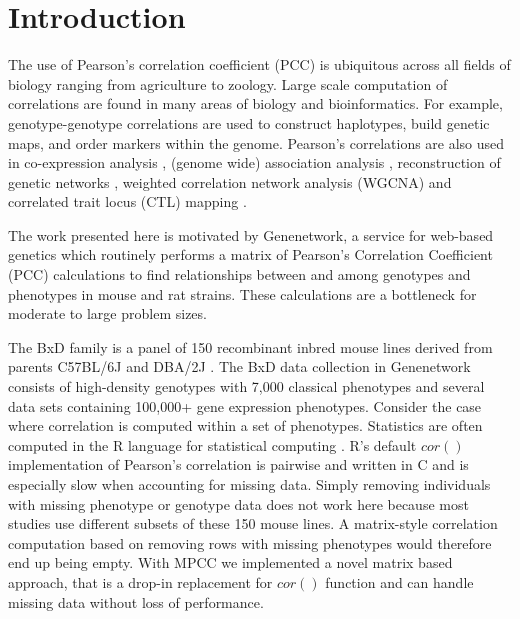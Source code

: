 \documentclass{bioinfo}
\begin{document}
\maketitle


\section{Introduction}

The use of Pearson's correlation coefficient (PCC) is ubiquitous
across all fields of biology ranging from agriculture to
zoology. Large scale computation of correlations are found in many
areas of biology and bioinformatics.  For example, genotype-genotype
correlations are used to construct haplotypes, build genetic maps, and
order markers within the genome. Pearson's correlations are also used
in co-expression analysis \citep{Tesson:2010}, (genome wide)
association analysis \citep{Cichonska:2016}, reconstruction of genetic
networks \citep{Fukushima:2013}, weighted correlation network analysis
(WGCNA) \citep{Horvath:2008} and correlated trait locus (CTL)
mapping \citep{Arends2016a}.



\enlargethispage{12pt}

The work presented here is motivated by Genenetwork, a service for
web-based genetics \citep{Sloan2016} which routinely performs a matrix
of Pearson's Correlation Coefficient (PCC) calculations to find
relationships between and among genotypes and phenotypes in mouse and
rat strains. These calculations are a bottleneck for moderate to large
problem sizes.



The BxD family is a panel of 150 recombinant inbred mouse lines
derived from parents C57BL/6J and DBA/2J \citep{Ashbrook:2019}. The
BxD data collection in Genenetwork consists of high-density genotypes
with 7,000 classical phenotypes and several data sets containing
100,000+ gene expression phenotypes. Consider the case where correlation 
is computed within a set of phenotypes. Statistics are often computed in
the R language for statistical computing \citep{R:2005}. R's default
$cor()$ implementation of Pearson's correlation is pairwise and
written in C and is especially slow when accounting for missing
data. Simply removing individuals with missing phenotype or genotype
data does not work here because most studies use different subsets of
these 150 mouse lines. A matrix-style correlation computation based on
removing rows with missing phenotypes would therefore end up being
empty. With MPCC we implemented a novel matrix based approach, that
is a drop-in replacement for $cor()$ function and can handle missing data
without loss of performance.
\end{document}
